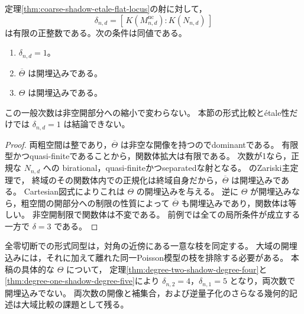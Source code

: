 \begin{proposition}[大域比較を決める一般次数]
\label{prop:poisson-shadow-degree-one-criterion}
定理\ref{thm:coarse-shadow-etale-flat-locus}の射に対して，
\[
 \delta_{n,d}
 =
 [\,K(M^{\mathrm{nc}}_{n,d}):K(N_{n,d})\,]
\]
は有限の正整数である。次の条件は同値である。
\begin{enumerate}
\item $\delta_{n,d}=1$。
\item $\overline\Theta$ は開埋込みである。
\item $\Theta$ は開埋込みである。
\end{enumerate}
この一般次数は非空開部分への縮小で変わらない。
本節の形式比較と\'{e}tale性だけでは $\delta_{n,d}=1$ は結論できない。
\end{proposition}
\begin{proof}
両粗空間は整であり，$\overline\Theta$ は非空な開像を持つのでdominantである。
有限型かつquasi-finiteであることから，関数体拡大は有限である。
次数が1なら，正規な $N_{n,d}$ への
birational，quasi-finiteかつseparatedな射となる。
\cite[Tag 082J]{StacksProject}のZariski主定理で，
終域のその関数体内での正規化は終域自身だから，$\overline\Theta$ は開埋込みである。
Cartesian図式によりこれは $\Theta$ の開埋込みを与える。
逆に $\Theta$ が開埋込みなら，粗空間の開部分への制限の性質によって
$\overline\Theta$ も開埋込みであり，関数体は等しい。
非空開制限で関数体は不変である。
前例では全ての局所条件が成立する一方で $\delta=3$ である。
\end{proof}

\begin{remark}
全零切断での形式同型は，対角の近傍にある一意な枝を同定する。
大域の開埋込みには，それに加えて離れた同一Poisson模型の枝を排除する必要がある。
本稿の具体的な $\Theta$ について，
定理\ref{thm:degree-two-shadow-degree-four}と\ref{thm:degree-one-shadow-degree-five}により
$\delta_{n,2}=4$，$\delta_{n,1}=5$ となり，両次数で開埋込みでない。
両次数の開像と補集合，および逆量子化のさらなる幾何的記述は大域比較の課題として残る。
\end{remark}
